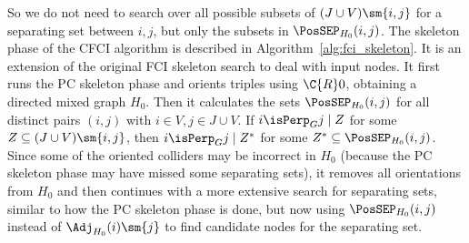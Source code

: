 So we do not need to search over all possible subsets of $(J \cup V) \sm \{i,j\}$ for a separating set between $i,j$, but only the subsets in $\PosSEP_{H_0}(i,j)$.
The skeleton phase of the CFCI algorithm is described in Algorithm~\ref{alg:fci_skeleton}. 
It is an extension of the original FCI skeleton search \cite{SMR1995} to deal with input nodes. 
It first runs the PC skeleton phase and orients triples using $\C{R}0$, obtaining a directed mixed graph $H_0$. 
Then it calculates the sets $\PosSEP_{H_0}(i,j)$ for all distinct pairs $(i,j)$ with $i \in V, j \in J \cup V$.
If $i \isPerp_G j \mid Z$ for some $Z \subseteq (J \cup V) \sm \{i,j\}$, then
$i \isPerp_G j \mid Z^*$ for some $Z^* \subseteq \PosSEP_{H_0}(i,j)$.
Since some of the oriented colliders may be incorrect in $H_0$ (because the PC skeleton phase may have missed some separating sets), it removes all orientations from $H_0$ and then continues with a more extensive search for separating sets, similar
to how the PC skeleton phase is done, but now using $\PosSEP_{H_0}(i,j)$ instead of $\Adj_{H_0}(i)\sm\{j\}$ to find candidate nodes for the separating set.

